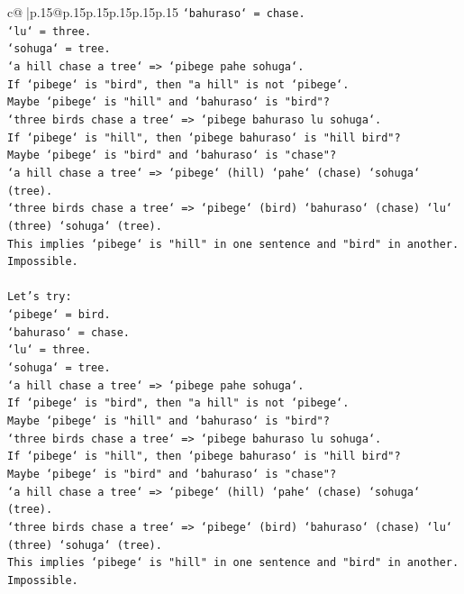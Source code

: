 \documentclass{article}
\begin{document}
{\begin{supertabular}{c@{$\;$}|p{.15\linewidth}@{}p{.15\linewidth}p{.15\linewidth}p{.15\linewidth}p{.15\linewidth}p{.15\linewidth}}
{{{\texttt{`bahuraso` = chase.} \\
\texttt{`lu` = three.} \\
\texttt{`sohuga` = tree.} \\
\texttt{`a hill chase a tree` => `pibege pahe sohuga`.} \\
\texttt{If `pibege` is "bird", then "a hill" is not `pibege`.} \\
\texttt{Maybe `pibege` is "hill" and `bahuraso` is "bird"?} \\
\texttt{`three birds chase a tree` => `pibege bahuraso lu sohuga`.} \\
\texttt{If `pibege` is "hill", then `pibege bahuraso` is "hill bird"?} \\
\texttt{Maybe `pibege` is "bird" and `bahuraso` is "chase"?} \\
\texttt{`a hill chase a tree` => `pibege` (hill) `pahe` (chase) `sohuga` (tree).} \\
\texttt{`three birds chase a tree` => `pibege` (bird) `bahuraso` (chase) `lu` (three) `sohuga` (tree).} \\
\texttt{This implies `pibege` is "hill" in one sentence and "bird" in another. Impossible.} \\
\\ 
\texttt{Let's try:} \\
\texttt{`pibege` = bird.} \\
\texttt{`bahuraso` = chase.} \\
\texttt{`lu` = three.} \\
\texttt{`sohuga` = tree.} \\
\texttt{`a hill chase a tree` => `pibege pahe sohuga`.} \\
\texttt{If `pibege` is "bird", then "a hill" is not `pibege`.} \\
\texttt{Maybe `pibege` is "hill" and `bahuraso` is "bird"?} \\
\texttt{`three birds chase a tree` => `pibege bahuraso lu sohuga`.} \\
\texttt{If `pibege` is "hill", then `pibege bahuraso` is "hill bird"?} \\
\texttt{Maybe `pibege` is "bird" and `bahuraso` is "chase"?} \\
\texttt{`a hill chase a tree` => `pibege` (hill) `pahe` (chase) `sohuga` (tree).} \\
\texttt{`three birds chase a tree` => `pibege` (bird) `bahuraso` (chase) `lu` (three) `sohuga` (tree).} \\
\texttt{This implies `pibege` is "hill" in one sentence and "bird" in another. Impossible.} \\
}}}
\end{supertabular}}
\end{document}
